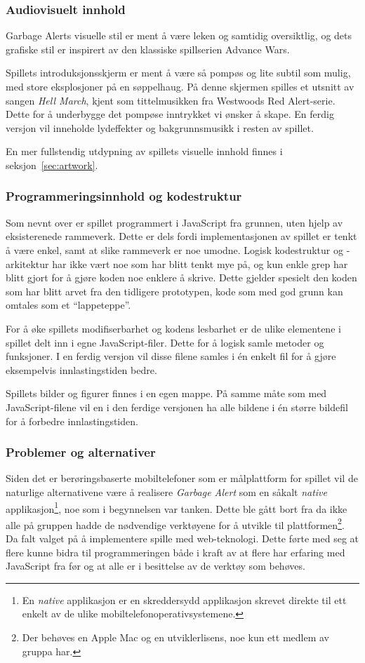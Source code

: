 \subsubsection{Audiovisuelt innhold}
{Garbage Alerts} visuelle stil er ment å være leken og samtidig
oversiktlig, og dets grafiske stil er inspirert av den klassiske
spillserien Advance Wars.

Spillets introduksjonsskjerm er ment å være så pompøs og lite subtil som
mulig, med store eksplosjoner på en søppelhaug. På denne skjermen
spilles et utsnitt av sangen \emph{Hell March}, kjent som tittelmusikken
fra Westwoods Red Alert-serie. Dette for å underbygge det pompøse
inntrykket vi ønsker å skape. En ferdig versjon vil inneholde
lydeffekter og bakgrunnsmusikk i resten av spillet.

En mer fullstendig utdypning av spillets visuelle innhold finnes i
seksjon~\ref{sec:artwork}.


\subsubsection{Programmeringsinnhold og kodestruktur}
Som nevnt over er spillet programmert i JavaScript fra grunnen, uten
hjelp av eksisterenede rammeverk. Dette er dels fordi
implementasjonen av spillet er tenkt å være enkel, samt at slike
rammeverk er noe umodne.  Logisk kodestruktur og -arkitektur har ikke
vært noe som har blitt tenkt mye på, og kun enkle grep har blitt gjort
for å gjøre koden noe enklere å skrive. Dette gjelder spesielt den koden
som har blitt arvet fra den tidligere prototypen, kode som med god grunn
kan omtales som et ``lappeteppe''.

For å øke spillets modifiserbarhet og kodens lesbarhet er de ulike
elementene i spillet delt inn i egne JavaScript-filer. Dette for å
logisk samle metoder og funksjoner. I en ferdig versjon vil disse filene
samles i én enkelt fil for å gjøre eksempelvis innlastingstiden bedre.

Spillets bilder og figurer finnes i en egen mappe. På samme måte som med
JavaScript-filene vil en i den ferdige versjonen ha alle bildene i én
større bildefil for å forbedre innlastingstiden.


\subsubsection{Problemer og alternativer}
Siden det er berøringsbaserte mobiltelefoner som er målplattform for
spillet vil de naturlige alternativene være å realisere \emph{Garbage Alert}
som en såkalt \emph{native} applikasjon\footnote{En \emph{native}
applikasjon er en skreddersydd applikasjon skrevet direkte til ett
enkelt av de ulike mobiltelefonoperativsystemene.}, noe som i
begynnelsen var tanken. Dette ble gått bort fra da ikke alle på gruppen
hadde de nødvendige verktøyene for å utvikle til
plattformen\footnote{Der behøves en Apple Mac og en utviklerlisens, noe
kun ett medlem av gruppa har.}. Da falt valget på å implementere
spille med web-teknologi. Dette førte med seg at flere kunne bidra til
programmeringen både i kraft av at flere har erfaring med JavaScript
fra før og at alle er i besittelse av de verktøy som behøves.

